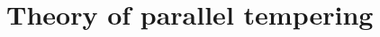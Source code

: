 \documentclass[xetex]{beamer}
\begin{document}



	

	\section[Theory]{Theory of parallel tempering}


	

\end{document}
